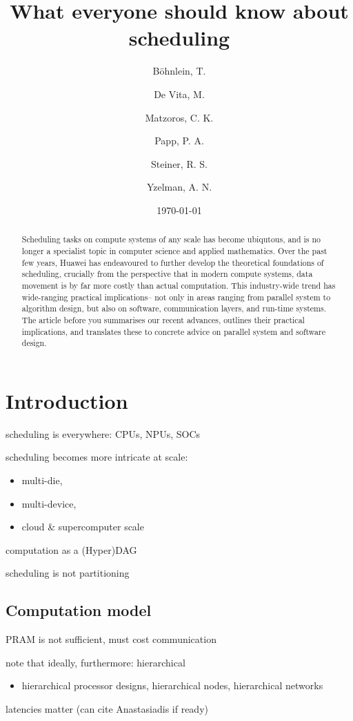 \documentclass[oneside,reqno, a4paper]{amsart}
\title{What everyone should know about scheduling} %
\author{B\"{o}hnlein, T.}
\author{De Vita, M.}
\author{Matzoros, C. K.}
\author{Papp, P. A.}
\author{Steiner, R. S.}
\author{Yzelman, A. N.}
\date{\today}
\numberwithin{equation}{section}
\let\Oldsection\section
\renewcommand{\section}{\FloatBarrier\Oldsection}
\begin{document}
\begin{abstract}
Scheduling tasks on compute systems of any scale has become ubiqutous,
and is no longer a specialist topic in computer science and applied mathematics.
Over the past few years, Huawei has endeavoured to further develop the theoretical foundations of scheduling,
crucially from the perspective that in modern compute systems,
data movement is by far more costly than actual computation.
This industry-wide trend has wide-ranging practical implications--
not only in areas ranging from parallel system to algorithm design,
but also on software, communication layers, and run-time systems.
The article before you summarises our recent advances,
outlines their practical implications,
and translates these to concrete advice on parallel system and software design.
\end{abstract}

\maketitle

\section{Introduction}

scheduling is everywhere: CPUs, NPUs, SOCs

scheduling becomes more intricate at scale:
\begin{itemize}
	\item multi-die,
	\item multi-device,
	\item cloud \& supercomputer scale
\end{itemize}

computation as a (Hyper)DAG

scheduling is not partitioning

\subsection{Computation model}
\label{sec:cost-models}

PRAM is not sufficient, must cost communication

note that ideally, furthermore: hierarchical
\begin{itemize}
	\item hierarchical processor designs, hierarchical nodes, hierarchical networks
\end{itemize}
latencies matter (can cite Anastasiadis if ready)
\end{document}
